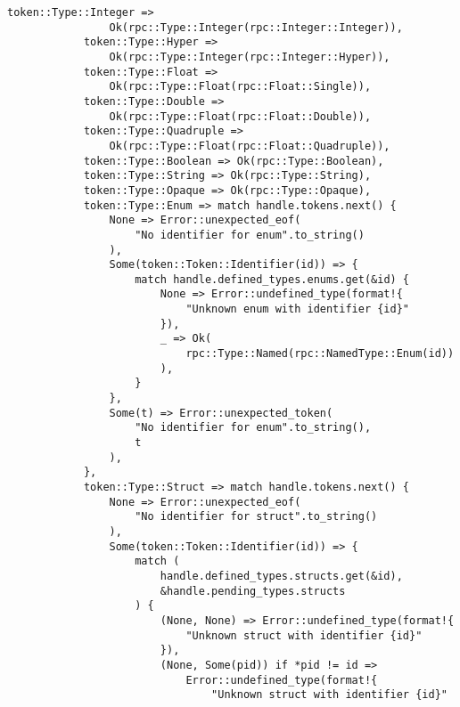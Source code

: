 \begin{lstlisting}[caption={Разбор типа (часть 2)}, label={lst:rust_parser_type2}]
            token::Type::Integer =>
                Ok(rpc::Type::Integer(rpc::Integer::Integer)),
            token::Type::Hyper =>
                Ok(rpc::Type::Integer(rpc::Integer::Hyper)),
            token::Type::Float =>
                Ok(rpc::Type::Float(rpc::Float::Single)),
            token::Type::Double =>
                Ok(rpc::Type::Float(rpc::Float::Double)),
            token::Type::Quadruple =>
                Ok(rpc::Type::Float(rpc::Float::Quadruple)),
            token::Type::Boolean => Ok(rpc::Type::Boolean),
            token::Type::String => Ok(rpc::Type::String),
            token::Type::Opaque => Ok(rpc::Type::Opaque),
            token::Type::Enum => match handle.tokens.next() {
                None => Error::unexpected_eof(
                    "No identifier for enum".to_string()
                ),
                Some(token::Token::Identifier(id)) => {
                    match handle.defined_types.enums.get(&id) {
                        None => Error::undefined_type(format!{
                            "Unknown enum with identifier {id}"
                        }),
                        _ => Ok(
                            rpc::Type::Named(rpc::NamedType::Enum(id))
                        ),
                    }
                },
                Some(t) => Error::unexpected_token(
                    "No identifier for enum".to_string(),
                    t
                ),
            },
            token::Type::Struct => match handle.tokens.next() {
                None => Error::unexpected_eof(
                    "No identifier for struct".to_string()
                ),
                Some(token::Token::Identifier(id)) => {
                    match (
                        handle.defined_types.structs.get(&id),
                        &handle.pending_types.structs
                    ) {
                        (None, None) => Error::undefined_type(format!{
                            "Unknown struct with identifier {id}"
                        }),
                        (None, Some(pid)) if *pid != id =>
                            Error::undefined_type(format!{
                                "Unknown struct with identifier {id}"
\end{lstlisting}
\clearpage
